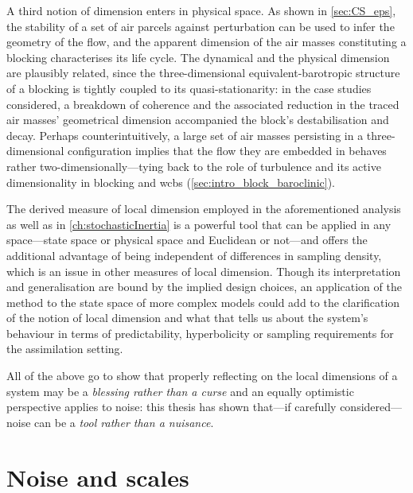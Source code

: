 \medskip

A third notion of dimension enters in physical space. As shown in
\cref{sec:CS_eps}, the stability of a set of air parcels against perturbation
can be used to infer the geometry of the flow, and the apparent dimension of
the air masses constituting a blocking characterises its life cycle. The
dynamical and the physical dimension are plausibly related, since the
three-dimensional equivalent-barotropic structure of a blocking is tightly
coupled to its quasi-stationarity: in the case studies considered, a breakdown
of coherence and the associated reduction in the traced air masses'
geometrical dimension accompanied the block's destabilisation and decay.
Perhaps counterintuitively, a large set of air masses persisting in a
three-dimensional configuration implies that the flow they are embedded in
behaves rather two-dimensionally---tying back to the role of turbulence and
its active dimensionality in blocking and \glspl{wcb}
(\cref{sec:intro_block_baroclinic}).

The derived measure of local dimension employed in the aforementioned analysis
as well as in \cref{ch:stochasticInertia}
is a powerful tool that can be applied
in any space---state space or physical space and Euclidean or not---and
offers the additional advantage of being independent of differences in
sampling density, which is an issue in other measures of local dimension.
Though its interpretation and generalisation are bound by the implied design
choices, an application of the method to the state space of more complex
models could add to the clarification of the notion of local dimension
and what that tells us about the system's behaviour in terms of predictability,
hyperbolicity or sampling requirements for the assimilation setting.

All of the above go to show that properly reflecting on the local dimensions
of a system may be a \emph{blessing rather than a curse} and an equally
optimistic
perspective applies to noise: this thesis has shown that---if carefully
considered---noise can be a \emph{tool rather than a nuisance}.

\section{Noise and scales}

